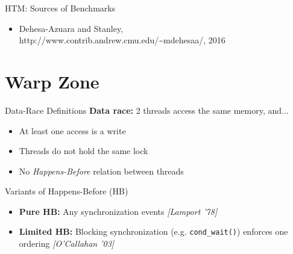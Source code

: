 \documentclass[xcolor=dvipsnames]{beamer}
\begin{document}


\begin{frame}{HTM: Sources of Benchmarks}
	\begin{itemize}
		\item Dehesa-Azuara and Stanley, http://www.contrib.andrew.cmu.edu/\textasciitilde{}mdehesaa/, 2016
	\end{itemize}
\end{frame}


\section{Warp Zone}


\begin{frame}{Data-Race Definitions}
	\textbf{Data race:} 2 threads access the same memory, and...
	\begin{itemize}
		\item At least one access is a write
		\item Threads do not hold the same lock
		\item No {\em Happens-Before} relation between threads
	\end{itemize}
	\pause
	\linegap

	Variants of Happens-Before (HB)
	\begin{itemize}
		\item {\bf Pure HB:} Any synchronization events {\em [Lamport '78]}
		\item {\bf Limited HB:} Blocking synchronization (e.g. \texttt{cond\_wait()}) enforces one ordering {\em [O'Callahan '03]}
	\end{itemize}
\end{frame}
\end{document}
